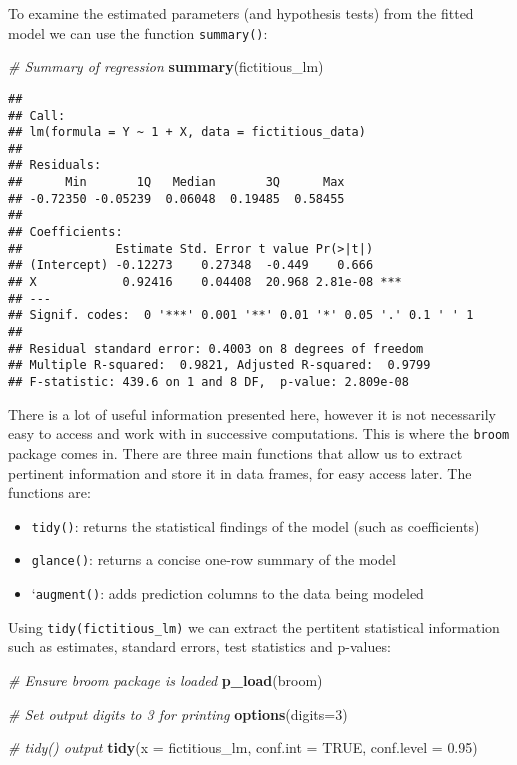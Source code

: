 \documentclass[
]{book}
\newenvironment{Shaded}{\begin{snugshade}}{\end{snugshade}}
\newcommand{\CommentTok}[1]{\textcolor[rgb]{0.56,0.35,0.01}{\textit{#1}}}
\newcommand{\DataTypeTok}[1]{\textcolor[rgb]{0.13,0.29,0.53}{#1}}
\newcommand{\DecValTok}[1]{\textcolor[rgb]{0.00,0.00,0.81}{#1}}
\newcommand{\FloatTok}[1]{\textcolor[rgb]{0.00,0.00,0.81}{#1}}
\newcommand{\KeywordTok}[1]{\textcolor[rgb]{0.13,0.29,0.53}{\textbf{#1}}}
\newcommand{\NormalTok}[1]{#1}
\newcommand{\OtherTok}[1]{\textcolor[rgb]{0.56,0.35,0.01}{#1}}
\providecommand{\tightlist}{%
  \setlength{\itemsep}{0pt}\setlength{\parskip}{0pt}}
\begin{document}
To examine the estimated parameters (and hypothesis tests) from the fitted model we can use the function \texttt{summary()}:

\begin{Shaded}
\begin{Highlighting}[]
\CommentTok{# Summary of regression }
\KeywordTok{summary}\NormalTok{(fictitious_lm)}
\end{Highlighting}
\end{Shaded}

\begin{verbatim}
## 
## Call:
## lm(formula = Y ~ 1 + X, data = fictitious_data)
## 
## Residuals:
##      Min       1Q   Median       3Q      Max 
## -0.72350 -0.05239  0.06048  0.19485  0.58455 
## 
## Coefficients:
##             Estimate Std. Error t value Pr(>|t|)    
## (Intercept) -0.12273    0.27348  -0.449    0.666    
## X            0.92416    0.04408  20.968 2.81e-08 ***
## ---
## Signif. codes:  0 '***' 0.001 '**' 0.01 '*' 0.05 '.' 0.1 ' ' 1
## 
## Residual standard error: 0.4003 on 8 degrees of freedom
## Multiple R-squared:  0.9821, Adjusted R-squared:  0.9799 
## F-statistic: 439.6 on 1 and 8 DF,  p-value: 2.809e-08
\end{verbatim}

There is a lot of useful information presented here, however it is not necessarily easy to access and work with in successive computations. This is where the \texttt{broom} package comes in. There are three main functions that allow us to extract pertinent information and store it in data frames, for easy access later. The functions are:

\begin{itemize}
\tightlist
\item
  \texttt{tidy()}: returns the statistical findings of the model (such as coefficients)
\item
  \texttt{glance()}: returns a concise one-row summary of the model
\item
  `\texttt{augment()}: adds prediction columns to the data being modeled
\end{itemize}

Using \texttt{tidy(fictitious\_lm)} we can extract the pertitent statistical information such as estimates, standard errors, test statistics and p-values:

\begin{Shaded}
\begin{Highlighting}[]
\CommentTok{# Ensure broom package is loaded}
\KeywordTok{p_load}\NormalTok{(broom)}

\CommentTok{# Set output digits to 3 for printing}
\KeywordTok{options}\NormalTok{(}\DataTypeTok{digits=}\DecValTok{3}\NormalTok{)}

\CommentTok{# tidy() output}
\KeywordTok{tidy}\NormalTok{(}\DataTypeTok{x =}\NormalTok{ fictitious_lm,}
     \DataTypeTok{conf.int =} \OtherTok{TRUE}\NormalTok{,}
     \DataTypeTok{conf.level =} \FloatTok{0.95}\NormalTok{)}
\end{Highlighting}
\end{Shaded}
\end{document}
